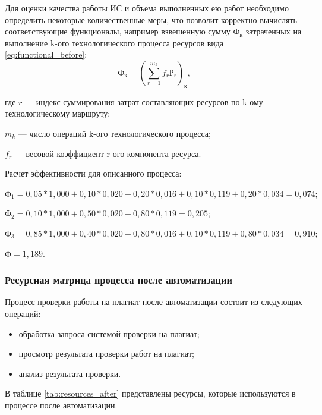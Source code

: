 			Для оценки качества работы ИС и объема выполненных ею работ необходимо определить некоторые количественные меры, что позволит корректно вычислять соответствующие функционалы, например взвешенную сумму $Ф_к$ затраченных на выполнение k-ого технологического процесса ресурсов вида \ref{eq:functional_before}:
			\begin{equation}\label{eq:functional_before}
				Ф_к = (\sum_{r=1}^{m_k} f_r Р_r)_к,				
			\end{equation}
			\begin{ESKDexplanation}
				\item[где ] $r$ 		--- индекс суммирования затрат составляющих ресурсов по k-ому технологическому маршруту;
				\item $m_k$ --- число операций k-ого технологического процесса;
				\item $f_r$ --- весовой коэффициент r-ого компонента ресурса.
			\end{ESKDexplanation}

			Расчет эффективности для описанного процесса:

			$Ф_1 = 0,05 * 1,000 + 0,10 * 0,020 + 0,20 * 0,016 + 0,10 * 0,119 + 0,20 * 0,034 = 0,074;$

			$Ф_2 = 0,10 * 1,000 + 0,50 * 0,020 + 0,80 * 0,119 = 0,205;$

			$Ф_3 = 0,85 * 1,000 + 0,40 * 0,020 + 0,80 * 0,016 + 0,10 * 0,119 + 0,80 * 0,034 = 0,910;$

			$Ф = 1,189.$

		\subsubsection{Ресурсная матрица процесса после автоматизации}	

			Процесс проверки работы на плагиат после автоматизации состоит из следующих операций:
			\begin{itemize}
				\item обработка запроса системой проверки на плагиат;
				\item просмотр результата проверки работ на плагиат;				
				\item анализ результата проверки.
			\end{itemize}

			В таблице \ref{tab:resources_after} представлены ресурсы, которые используются в процессе после автоматизации.

